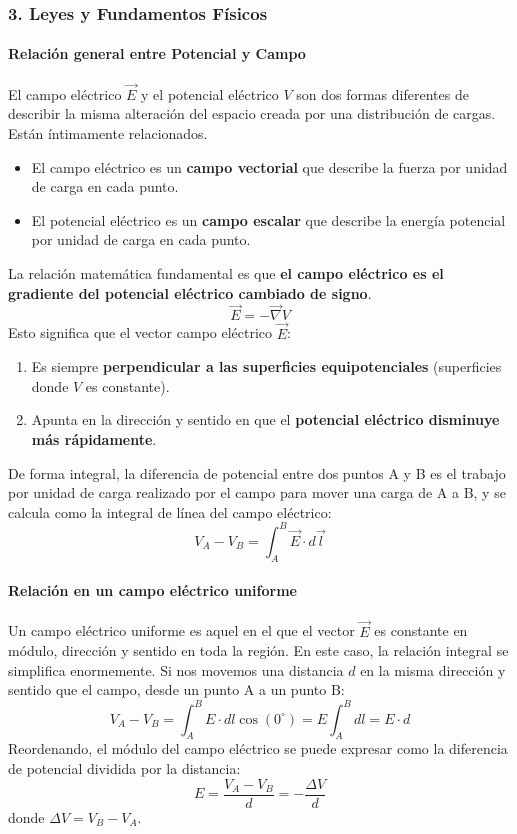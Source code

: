 \subsubsection*{3. Leyes y Fundamentos Físicos}
\paragraph{Relación general entre Potencial y Campo}
El campo eléctrico $\vec{E}$ y el potencial eléctrico $V$ son dos formas diferentes de describir la misma alteración del espacio creada por una distribución de cargas. Están íntimamente relacionados.
\begin{itemize}
    \item El campo eléctrico es un \textbf{campo vectorial} que describe la fuerza por unidad de carga en cada punto.
    \item El potencial eléctrico es un \textbf{campo escalar} que describe la energía potencial por unidad de carga en cada punto.
\end{itemize}
La relación matemática fundamental es que \textbf{el campo eléctrico es el gradiente del potencial eléctrico cambiado de signo}.
$$ \vec{E} = -\vec{\nabla}V $$
Esto significa que el vector campo eléctrico $\vec{E}$:
\begin{enumerate}
    \item Es siempre \textbf{perpendicular a las superficies equipotenciales} (superficies donde $V$ es constante).
    \item Apunta en la dirección y sentido en que el \textbf{potencial eléctrico disminuye más rápidamente}.
\end{enumerate}
De forma integral, la diferencia de potencial entre dos puntos A y B es el trabajo por unidad de carga realizado por el campo para mover una carga de A a B, y se calcula como la integral de línea del campo eléctrico:
$$ V_A - V_B = \int_A^B \vec{E} \cdot d\vec{l} $$

\paragraph{Relación en un campo eléctrico uniforme}
Un campo eléctrico uniforme es aquel en el que el vector $\vec{E}$ es constante en módulo, dirección y sentido en toda la región.
En este caso, la relación integral se simplifica enormemente. Si nos movemos una distancia $d$ en la misma dirección y sentido que el campo, desde un punto A a un punto B:
$$ V_A - V_B = \int_A^B E \cdot dl \cos(0^\circ) = E \int_A^B dl = E \cdot d $$
Reordenando, el módulo del campo eléctrico se puede expresar como la diferencia de potencial dividida por la distancia:
$$ E = \frac{V_A - V_B}{d} = -\frac{\Delta V}{d} $$
donde $\Delta V = V_B - V_A$.

